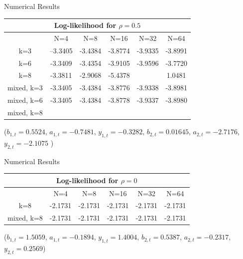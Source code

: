 \documentclass{beamer}
\begin{document}
\begin{frame}{Numerical Results}

\begin{centering}
\begin{tabular}{|c|c|c|c|c|c|}
\multicolumn{6}{c}{Log-likelihood for $\rho = 0.5$} \\\hline
		& N=4 & N=8 & N=16 & N=32 & N=64  \\\hline
k=3 &--3.3405 & -3.4384 & -3.8774 & -3.9335 & -3.8991 \\\hline
k=6 & -3.3409 & -3.4354 & -3.9105 & -3.9596 & -3.7720 \\\hline
k=8 & -3.3811 & -2.9068 & -5.4378 & \cellcolor{red!50}{$-\infty$} & 1.0481 \\\hline \hline
mixed, k=3 & -3.3405 & -3.4384 & -3.8776 & -3.9338 & -3.8981 \\\hline
mixed, k=6 & -3.3405 & -3.4384 & -3.8778 & -3.9337 & -3.8980 \\\hline
mixed, k=8 & \cellcolor{blue!50}{-3.3405} & \cellcolor{blue!40}{-3.4384} & \cellcolor{blue!30}{-3.8778} & \cellcolor{blue!20}{-3.9337} & \cellcolor{blue!10}{-3.8980} \\\hline
\end{tabular}
\end{centering}

\vspace{1mm}
($b_{1,t} = 0.5524$, $a_{1,t}=-0.7481$, $y_{1,t}=-0.3282$, $b_{2,t}=0.01645$, $a_{2,t}=-2.7176$, $y_{2,t}=-2.1075$
)

\end{frame}




\begin{frame}{Numerical Results}

\begin{centering}
\begin{tabular}{|c|c|c|c|c|c|}
\multicolumn{6}{c}{Log-likelihood for $\rho = 0$} \\\hline
		& N=4 & N=8 & N=16 & N=32 & N=64  \\\hline
k=8 & -2.1731 & -2.1731 & -2.1731 & -2.1731 & -2.1731 \\\hline \hline
mixed, k=8 & -2.1731 & -2.1731 & -2.1731 & -2.1731 & -2.1731 \\\hline
\end{tabular}
\end{centering}

\vspace{1mm}
($b_{1,t}=1.5059$, $a_{1,t}=-0.1894$, $y_{1,t}=1.4004$, $b_{2,t}=0.5387$, $a_{2,t}=-0.2317$, $y_{2,t}=0.2569$)
\end{frame}
\end{document}

